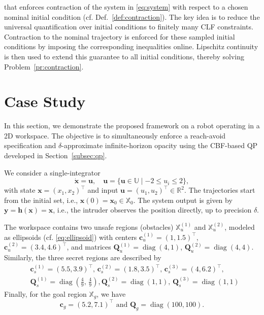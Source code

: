 \documentclass[letterpaper, 10 pt, conference]{ieeeconf}  %
\begin{document}
that enforces contraction of the system in \eqref{eq:system} with respect to a chosen nominal initial condition (cf. Def.~\ref{def:contraction}). The key idea is to reduce the universal quantification over initial conditions to finitely many CLF constraints. Contraction to the nominal trajectory is enforced for these sampled initial conditions by imposing the corresponding inequalities online. Lipschitz continuity is then used to extend this guarantee to all initial conditions, thereby solving Problem~\ref{pr:contraction}.

\section{Case Study} \label{sec:case_study}

In this section, we demonstrate the proposed framework on a robot operating in a 2D workspace. The objective is to simultaneously enforce a reach-avoid specification and $\delta$-approximate infinite-horizon opacity using the CBF-based QP developed in Section~\ref{subsec:qp}.

We consider a single-integrator
\begin{equation}
    \dot{\mathbf{x}} = \mathbf{u}, \quad \mathbf{u} = \{ \mathbf{u} \in \mathbb{U} \mid -2 \leq u_i \leq 2\},
\end{equation}
with state $\mathbf{x} = (x_1, x_2)^\top$ and input $\mathbf{u} = (u_1, u_2)^\top \in \mathbb{R}^2$. The trajectories start from the initial set, i.e., $\mathbf{x}(0) = \mathbf{x}_0 \in \mathbb{X}_0$. The system output is given by $\mathbf{y} = \mathbf{h}(\mathbf{x}) = \mathbf{x}$, i.e., the intruder observes the position directly, up to precision $\delta$.

The workspace contains two unsafe regions (obstacles) $\mathbb{X}_u^{(1)}$ and $\mathbb{X}_u^{(2)}$, modeled as ellipsoids (cf. \eqref{eq:ellipsoid}) with centers $\mathbf{c}_u^{(1)} = (1, 1.5)^\top$, $\mathbf{c}_u^{(2)} = (3.4, 4.6)^\top$, and matrices $\mathbf{Q}_u^{(1)} = \operatorname{diag}(4, 1)$, $\mathbf{Q}_u^{(2)} = \operatorname{diag}(4, 4)$. Similarly, the three secret regions are described by
\begin{equation*}
    \begin{aligned}
        &\mathbf{c}_s^{(1)} = (5.5, 3.9)^\top, \, \mathbf{c}_s^{(2)} = (1.8, 3.5)^\top, \, \mathbf{c}_s^{(3)} = (4, 6.2)^\top, \\
        &\mathbf{Q}_s^{(1)} = \operatorname{diag}(\tfrac{4}{9}, \, \tfrac{4}{9}), \mathbf{Q}_s^{(2)} = \operatorname{diag}(1, 1), \, \mathbf{Q}_s^{(3)} = \operatorname{diag}(1, 1)
    \end{aligned}
\end{equation*}
Finally, for the goal region $\mathbb{X}_g$, we have
\begin{equation*}
    \mathbf{c}_g = (5.2, 7.1)^\top \text{ and } \mathbf{Q}_g = \operatorname{diag}(100, 100).
\end{equation*}
\end{document}
